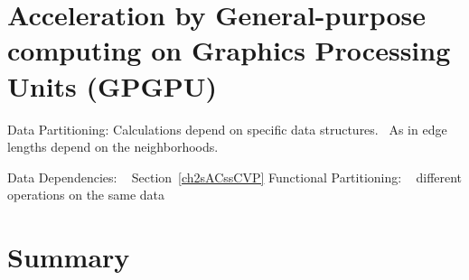 %
%
%
%
\section[Acceleration by GPGPU]{Acceleration by General-purpose
computing on Graphics Processing Units (GPGPU)}

%
Data Partitioning:
Calculations depend on specific data structures.~\cite[p.~357]{Lang17}
As in edge lengths depend on the neighborhoods.

%
Data Dependencies: ~\cite[p.~358]{Lang17}
Section~\ref{ch2sACssCVP}
%
Functional Partitioning: ~\cite[p.~359]{Lang17}
different operations on the same data

%
%
%
\section{Summary}

